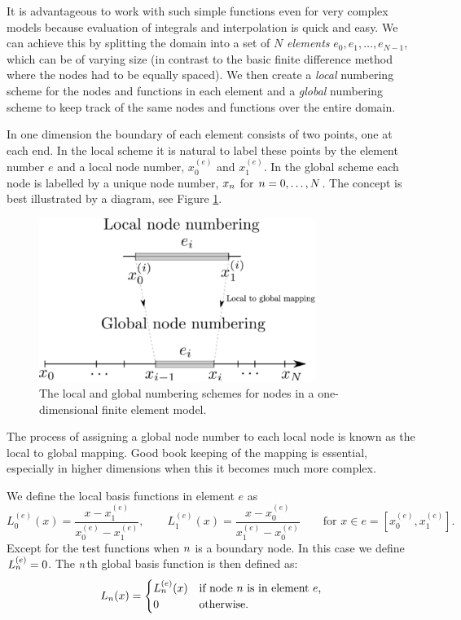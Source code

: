 It is advantageous to work with such simple functions even for very complex
models because evaluation of integrals and interpolation is quick and easy. We
can achieve this by splitting the domain into a set of $N$ \emph{elements}
$e_{0},e_{1},\ldots,e_{N-1}$, which can be of varying size (in contrast to the
basic finite difference method where the nodes had to be equally spaced). We
then create a \emph{local} numbering scheme for the nodes and functions in each
element and a \emph{global} numbering scheme to keep track of the same nodes and
functions over the entire domain.

In one dimension the boundary of each element consists of two points, one at
each end. In the local scheme it is natural to label these points by the element
number $e$ and a local node number, \ie $x_{0}^{(e)}$ and $x_{1}^{(e)}$. In the
global scheme each node is labelled by a unique node number, \ie $x_{n}$ for
$n=0,\ldots,N$. The concept is best illustrated by a diagram, see Figure
\ref{fig:local-global-numbering}.

\begin{figure}[ht]
  \center
  \includegraphics[width=0.8\textwidth]{./images/local_global_numbering}
  \caption{The local and global numbering schemes for nodes in a one-dimensional
    finite element model.}
  \label{fig:local-global-numbering}
\end{figure}

The process of assigning a global node number to each local node is known as the
local to global mapping. Good book keeping of the mapping is essential,
especially in higher dimensions when this it becomes much more complex.

We define the local basis functions in element $e$ as
\begin{equation}
  L_{0}^{(e)}(x)=\dfrac{x-x_{1}^{(e)}}{x_{0}^{(e)}-x_{1}^{(e)}},\qquad
  L_{1}^{(e)}(x)=\dfrac{x-x_{0}^{(e)}}{x_{1}^{(e)}-x_{0}^{(e)}}
  \qquad\text{for }x\in e=[x_{0}^{(e)},x_{1}^{(e)}].
  \label{eq:32}
\end{equation}
Except for the test functions when $n$ is a boundary node. In this case we define $L_n^{(e)} = 0$.
The $n$th global basis function is then defined as:
\begin{equation}
  \label{eq:33}
  L_n(x) =
  \begin{cases}
    L_n^{(e)}(x) & \text{if node $n$ is in element $e$,} \\
    0 & \text{otherwise.}
  \end{cases}
\end{equation}

